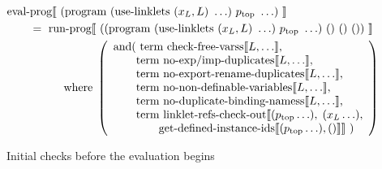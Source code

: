\begin{figure}[!h]
\centering
\begin{align*}
  &\text{eval-prog}\llbracket~(\text{program}~(\text{use-linklets}~(x_L, L)~\ldots)~p_{\text{top}}~\ldots)~\rrbracket \\
  &\qquad =\ \text{run-prog}\llbracket~((\text{program}~(\text{use-linklets}~(x_L, L)~\ldots)~p_{\text{top}}~\ldots)~()~()~())~\rrbracket \\
  &\hspace{5em} \text{where}\;\left(
    \begin{array}{l}
      \text{and( term check-free-varss$\llbracket L, \ldots \rrbracket$,} \\
      \text{\qquad term no-exp/imp-duplicates$\llbracket L, \ldots \rrbracket$,} \\
      \text{\qquad term no-export-rename-duplicates$\llbracket L, \ldots \rrbracket$,} \\
      \text{\qquad term no-non-definable-variables$\llbracket L, \ldots \rrbracket$,} \\
      \text{\qquad term no-duplicate-binding-namess$\llbracket L, \ldots \rrbracket$,} \\
      \text{\qquad term linklet-refs-check-out$\llbracket (p_{\text{top}}\ldots),\;(x_L\ldots),$}\\
      \text{\qquad\qquad get-defined-instance-ids$\llbracket(p_{\text{top}}\ldots),() \rrbracket \rrbracket$ )}
    \end{array}
  \right)
\end{align*}
\caption{Initial checks before the evaluation begins}
\label{fig:restricted-lkl-eval-prog}
\end{figure}
